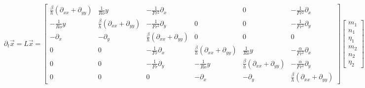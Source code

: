 \documentclass[10pt]{article}
\newcommand{\pd}[1]{\partial_{#1}}
\begin{document}
\[\pd{t}\vec{x} = L\vec{x}=
\left[\begin{array}{ccc|ccc}
\frac{\beta}{h}(\pd{xx}+\pd{yy}) & \frac{1}{Ro}y & -\frac{1}{Fr^2}\pd{x} &  & 0 & -\frac{1}{Fr^2}\pd{x} \\
-\frac{1}{Ro}y & \frac{\beta}{h}(\pd{xx}+\pd{yy})  & -\frac{1}{Fr^2}\pd{y} & 0 & 0 & -\frac{1}{Fr^2}\pd{y}\\
-\pd{x} & -\pd{y} & \frac{\beta}{h}(\pd{xx}+\pd{yy})  & 0 & 0 & 0 \\ \hline
0 & 0 & -\frac{1}{Fr}\pd{x} & \frac{\beta}{h}(\pd{xx}+\pd{yy})  & \frac{1}{Ro}y &  -\frac{\alpha}{Fr^2}\pd{x} \\
0 & 0 & -\frac{1}{Fr}\pd{y} & -\frac{1}{Ro}y  & \frac{\beta}{h}(\pd{xx}+\pd{yy}) &  -\frac{\alpha}{Fr^2}\pd{y} \\
0 & 0 & 0 & -\pd{x} & -\pd{y} & \frac{\beta}{h}(\pd{xx}+\pd{yy}) 
\end{array}\right] \begin{bmatrix}
m_1\\
n_1\\
\eta_1\\
m_2\\
n_2\\
\eta_2
\end{bmatrix} = \begin{bmatrix}
\pd{t}m_1\\
\pd{t}n_1\\
\pd{t}\eta_1\\
\pd{t}m_2\\
\pd{t}n_2\\
\pd{t}\eta_2
\end{bmatrix}
\]
\end{document}
